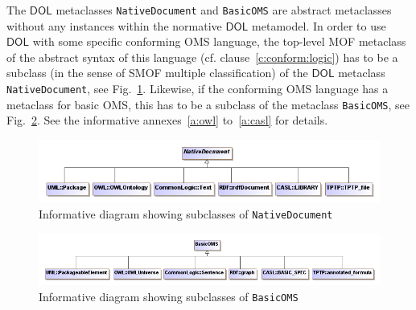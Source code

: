 \documentclass[10pt, a4paper]{isov2}
\makeatletter
\newcommand*{\cf}{cf.\@\xspace}
\newcommand*{\syntax}[1]{\texttt{#1}}
\newcommand*{\DOL}{\ensuremath{\mathsf{DOL}}\xspace}
\renewcommand{\clauserefname}{clause}
\renewcommand{\cref}[1]{\clauserefname~\ref{#1}}
\makeatother
\begin{document}
The \DOL metaclasses \syntax{NativeDocument} and \syntax{BasicOMS} are
abstract metaclasses without any instances within the normative \DOL
metamodel.  In order to use \DOL with some specific conforming OMS language, the top-level MOF
metaclass of the abstract syntax of this language
(\cf \cref{c:conform:logic}) has to be a subclass (in the sense of
SMOF multiple classification) of the \DOL metaclass
\syntax{NativeDocument}, see Fig.~\ref{fig:native_document}. 
Likewise, if the conforming OMS language has a metaclass for basic OMS,
this has to be a subclass of the metaclass \syntax{BasicOMS},
see Fig.~\ref{fig:basic_oms}.
See the informative annexes~\ref{a:owl} to~\ref{a:casl} for details.


\begin{figure}[b]
  \centering
    \includegraphics[scale=0.47]{mof/native_document.png}
   \caption{Informative diagram showing subclasses of \syntax{NativeDocument}}
   \label{fig:native_document}
\end{figure}


\begin{figure}
  \centering
    \includegraphics[scale=0.47]{mof/basic_oms.png}
   \caption{Informative diagram showing subclasses of \syntax{BasicOMS}}
   \label{fig:basic_oms}
\end{figure}


\label{c:libraries}


\end{document}
